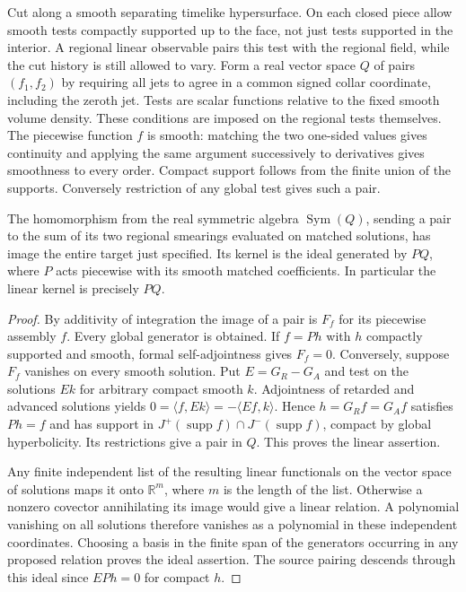 Cut along a smooth separating timelike hypersurface. On each closed piece allow smooth tests compactly supported up to the face, not just tests supported in the interior. A regional linear observable pairs this test with the regional field, while the cut history is still allowed to vary. Form a real vector space $Q$ of pairs $(f_1,f_2)$ by requiring all jets to agree in a common signed collar coordinate, including the zeroth jet. Tests are scalar functions relative to the fixed smooth volume density. These conditions are imposed on the regional tests themselves. The piecewise function $f$ is smooth: matching the two one-sided values gives continuity and applying the same argument successively to derivatives gives smoothness to every order. Compact support follows from the finite union of the supports. Conversely restriction of any global test gives such a pair.

\begin{proposition}
The homomorphism from the real symmetric algebra $\operatorname{Sym}(Q)$, sending a pair to the sum of its two regional smearings evaluated on matched solutions, has image the entire target just specified. Its kernel is the ideal generated by $P Q$, where $P$ acts piecewise with its smooth matched coefficients. In particular the linear kernel is precisely $P Q$.
\end{proposition}
\begin{proof}
By additivity of integration the image of a pair is $F_f$ for its piecewise assembly $f$. Every global generator is obtained. If $f=Ph$ with $h$ compactly supported and smooth, formal self-adjointness gives $F_f=0$. Conversely, suppose $F_f$ vanishes on every smooth solution. Put $E=G_R-G_A$ and test on the solutions $E k$ for arbitrary compact smooth $k$. Adjointness of retarded and advanced solutions yields $0=\langle f,E k\rangle=-\langle E f,k\rangle$. Hence $h=G_R f=G_A f$ satisfies $Ph=f$ and has support in $J^+(\operatorname{supp} f)\cap J^-(\operatorname{supp} f)$, compact by global hyperbolicity. Its restrictions give a pair in $Q$. This proves the linear assertion.

Any finite independent list of the resulting linear functionals on the vector space of solutions maps it onto $\mathbb R^m$, where $m$ is the length of the list. Otherwise a nonzero covector annihilating its image would give a linear relation. A polynomial vanishing on all solutions therefore vanishes as a polynomial in these independent coordinates. Choosing a basis in the finite span of the generators occurring in any proposed relation proves the ideal assertion. The source pairing descends through this ideal since $EP h=0$ for compact $h$.
\end{proof}

